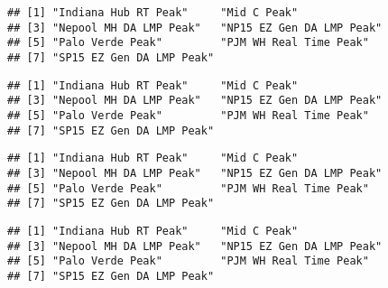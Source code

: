 \documentclass[
]{article}
\newenvironment{Shaded}{\begin{snugshade}}{\end{snugshade}}
\newcommand{\AttributeTok}[1]{\textcolor[rgb]{0.13,0.29,0.53}{#1}}
\newcommand{\CommentTok}[1]{\textcolor[rgb]{0.56,0.35,0.01}{\textit{#1}}}
\newcommand{\FunctionTok}[1]{\textcolor[rgb]{0.13,0.29,0.53}{\textbf{#1}}}
\newcommand{\NormalTok}[1]{#1}
\newcommand{\SpecialCharTok}[1]{\textcolor[rgb]{0.81,0.36,0.00}{\textbf{#1}}}
\newcommand{\StringTok}[1]{\textcolor[rgb]{0.31,0.60,0.02}{#1}}
\begin{document}
\begin{verbatim}
## [1] "Indiana Hub RT Peak"     "Mid C Peak"             
## [3] "Nepool MH DA LMP Peak"   "NP15 EZ Gen DA LMP Peak"
## [5] "Palo Verde Peak"         "PJM WH Real Time Peak"  
## [7] "SP15 EZ Gen DA LMP Peak"
\end{verbatim}

\begin{Shaded}
\end{Shaded}

\begin{verbatim}
## [1] "Indiana Hub RT Peak"     "Mid C Peak"             
## [3] "Nepool MH DA LMP Peak"   "NP15 EZ Gen DA LMP Peak"
## [5] "Palo Verde Peak"         "PJM WH Real Time Peak"  
## [7] "SP15 EZ Gen DA LMP Peak"
\end{verbatim}

\begin{Shaded}
\end{Shaded}

\begin{verbatim}
## [1] "Indiana Hub RT Peak"     "Mid C Peak"             
## [3] "Nepool MH DA LMP Peak"   "NP15 EZ Gen DA LMP Peak"
## [5] "Palo Verde Peak"         "PJM WH Real Time Peak"  
## [7] "SP15 EZ Gen DA LMP Peak"
\end{verbatim}

\begin{Shaded}
\end{Shaded}

\begin{verbatim}
## [1] "Indiana Hub RT Peak"     "Mid C Peak"             
## [3] "Nepool MH DA LMP Peak"   "NP15 EZ Gen DA LMP Peak"
## [5] "Palo Verde Peak"         "PJM WH Real Time Peak"  
## [7] "SP15 EZ Gen DA LMP Peak"
\end{verbatim}
\end{document}
